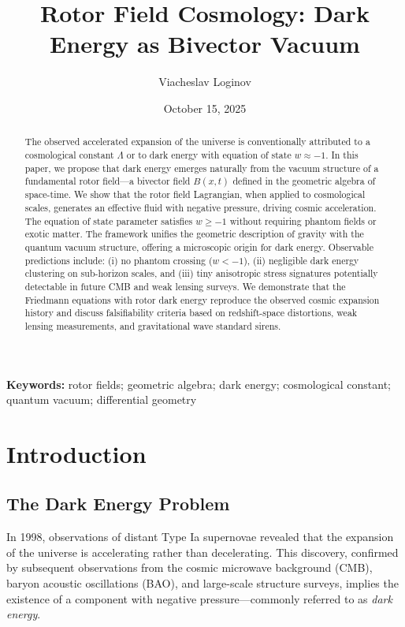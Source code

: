 \documentclass[11pt,a4paper]{article}
\title{Rotor Field Cosmology: Dark Energy as Bivector Vacuum}
\author[1]{Viacheslav Loginov}
\affil[1]{Kyiv, Ukraine\\ \texttt{barthez.slavik@gmail.com}}
\date{October 15, 2025}
\numberwithin{equation}{section}
\theoremstyle{plain}
\theoremstyle{definition}
\theoremstyle{remark}
\newcommand{\keywords}{\textbf{Keywords:} rotor fields; geometric algebra; dark energy; cosmological constant; quantum vacuum; differential geometry}
\begin{document}
\maketitle

\begin{abstract}
The observed accelerated expansion of the universe is conventionally attributed to a cosmological constant $\Lambda$ or to dark energy with equation of state $w \approx -1$. In this paper, we propose that dark energy emerges naturally from the vacuum structure of a fundamental rotor field---a bivector field $B(x,t)$ defined in the geometric algebra of space-time. We show that the rotor field Lagrangian, when applied to cosmological scales, generates an effective fluid with negative pressure, driving cosmic acceleration. The equation of state parameter satisfies $w \geq -1$ without requiring phantom fields or exotic matter. The framework unifies the geometric description of gravity with the quantum vacuum structure, offering a microscopic origin for dark energy. Observable predictions include: (i) no phantom crossing ($w < -1$), (ii) negligible dark energy clustering on sub-horizon scales, and (iii) tiny anisotropic stress signatures potentially detectable in future CMB and weak lensing surveys. We demonstrate that the Friedmann equations with rotor dark energy reproduce the observed cosmic expansion history and discuss falsifiability criteria based on redshift-space distortions, weak lensing measurements, and gravitational wave standard sirens.
\end{abstract}

\keywords

\section{Introduction}
\label{sec:intro}

\subsection{The Dark Energy Problem}

In 1998, observations of distant Type Ia supernovae revealed that the expansion of the universe is accelerating rather than decelerating. This discovery, confirmed by subsequent observations from the cosmic microwave background (CMB), baryon acoustic oscillations (BAO), and large-scale structure surveys, implies the existence of a component with negative pressure---commonly referred to as \emph{dark energy}.
\end{document}
